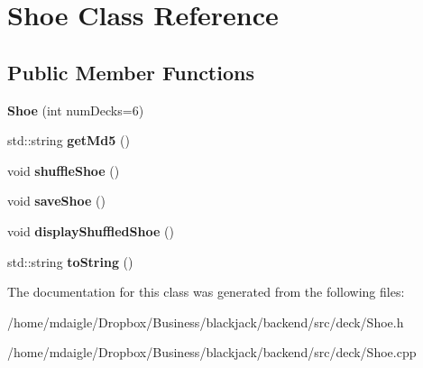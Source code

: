 \hypertarget{classShoe}{
\section{\-Shoe \-Class \-Reference}
\label{d8/d0e/classShoe}
}
\subsection*{\-Public \-Member \-Functions}
\begin{DoxyCompactItemize}
\item 
\hypertarget{classShoe_aeb67304b8ef6ebac0b3216a560d82b08}{
{\bfseries \-Shoe} (int num\-Decks=6)}
\label{d8/d0e/classShoe_aeb67304b8ef6ebac0b3216a560d82b08}

\item 
\hypertarget{classShoe_a5abb97969b12b705b3483f4416dfc1d5}{
std\-::string {\bfseries get\-Md5} ()}
\label{d8/d0e/classShoe_a5abb97969b12b705b3483f4416dfc1d5}

\item 
\hypertarget{classShoe_abdf1c44268fc1af6256f3f98eddb63bf}{
void {\bfseries shuffle\-Shoe} ()}
\label{d8/d0e/classShoe_abdf1c44268fc1af6256f3f98eddb63bf}

\item 
\hypertarget{classShoe_a65f8ef26fab739237b9292fbb34ca58f}{
void {\bfseries save\-Shoe} ()}
\label{d8/d0e/classShoe_a65f8ef26fab739237b9292fbb34ca58f}

\item 
\hypertarget{classShoe_ac7ffcbc9ea83427b298a1b01c6aea7e0}{
void {\bfseries display\-Shuffled\-Shoe} ()}
\label{d8/d0e/classShoe_ac7ffcbc9ea83427b298a1b01c6aea7e0}

\item 
\hypertarget{classShoe_ad894b6edf1e50aa8d9d13a0e00d58850}{
std\-::string {\bfseries to\-String} ()}
\label{d8/d0e/classShoe_ad894b6edf1e50aa8d9d13a0e00d58850}

\end{DoxyCompactItemize}


\-The documentation for this class was generated from the following files\-:\begin{DoxyCompactItemize}
\item 
/home/mdaigle/\-Dropbox/\-Business/blackjack/backend/src/deck/\-Shoe.\-h\item 
/home/mdaigle/\-Dropbox/\-Business/blackjack/backend/src/deck/\-Shoe.\-cpp\end{DoxyCompactItemize}

